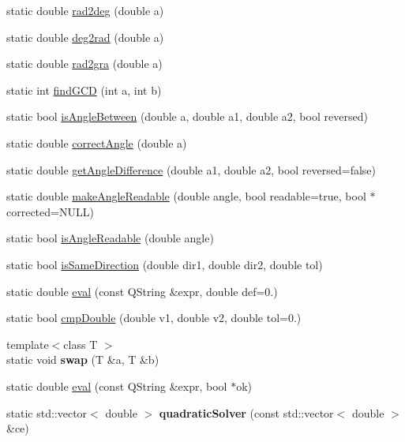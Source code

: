 \begin{DoxyCompactItemize}
\item 
static double \hyperlink{classRS__Math_a04db55c8e170d671d80279bf6c03b38a}{rad2deg} (double a)
\item 
static double \hyperlink{classRS__Math_a75fd326199dde13acfa5d818228d7bcb}{deg2rad} (double a)
\item 
static double \hyperlink{classRS__Math_a71f904220f6c5d8ca21b01736dc7f9af}{rad2gra} (double a)
\item 
static int \hyperlink{classRS__Math_a619b4d214558b1cdefeb48664ceca6a4}{find\-G\-C\-D} (int a, int b)
\item 
static bool \hyperlink{classRS__Math_ab36a8ac371a6c61e883c9d6ec267b257}{is\-Angle\-Between} (double a, double a1, double a2, bool reversed)
\item 
static double \hyperlink{classRS__Math_a47e501d73133a0b89a3ceafd9472d1aa}{correct\-Angle} (double a)
\item 
static double \hyperlink{classRS__Math_a8322ddc8fd8171414bf3c88d5054a501}{get\-Angle\-Difference} (double a1, double a2, bool reversed=false)
\item 
static double \hyperlink{classRS__Math_a5dbb5b417074a25c7a6c51e90b431886}{make\-Angle\-Readable} (double angle, bool readable=true, bool $\ast$corrected=N\-U\-L\-L)
\item 
static bool \hyperlink{classRS__Math_a7f5e8c16996cdc0d932afbd20598e11d}{is\-Angle\-Readable} (double angle)
\item 
static bool \hyperlink{classRS__Math_aa5f878b254a910ee3ab29d61572ac8c2}{is\-Same\-Direction} (double dir1, double dir2, double tol)
\item 
static double \hyperlink{classRS__Math_a5b36874b3feae9cfea03a2647ad7ccc7}{eval} (const Q\-String \&expr, double def=0.)
\item 
static bool \hyperlink{classRS__Math_ad38812764771b9a01e014ca0aa904e22}{cmp\-Double} (double v1, double v2, double tol=0.)
\item 
\hypertarget{classRS__Math_a6372e0ddd3e53248bbeae3a4afcc2f3a}{{\footnotesize template$<$class T $>$ }\\static void {\bfseries swap} (T \&a, T \&b)}\label{classRS__Math_a6372e0ddd3e53248bbeae3a4afcc2f3a}

\item 
static double \hyperlink{classRS__Math_a28d5ab64462183ef928c795932b76a7a}{eval} (const Q\-String \&expr, bool $\ast$ok)
\item 
\hypertarget{classRS__Math_a6aa16c5aac5cf6114d2d3bdd5ea86f70}{static std\-::vector$<$ double $>$ {\bfseries quadratic\-Solver} (const std\-::vector$<$ double $>$ \&ce)}\label{classRS__Math_a6aa16c5aac5cf6114d2d3bdd5ea86f70}


\end{DoxyCompactItemize}
